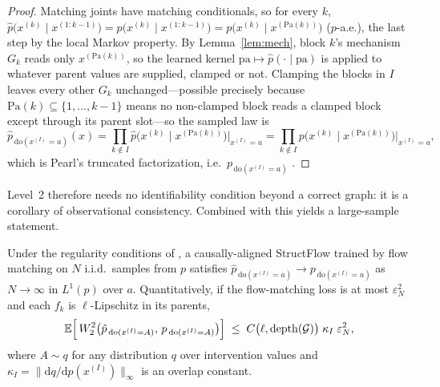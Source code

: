 \begin{proof}
Matching joints have matching conditionals, so for every $k$,
$\hat p\bigl(x^{(k)} \mid x^{(1:k-1)}\bigr) = p\bigl(x^{(k)} \mid x^{(1:k-1)}\bigr)
= p\bigl(x^{(k)} \mid x^{(\mathrm{Pa}(k))}\bigr)$ ($p$-a.e.), the last step by the local
Markov property. By Lemma~\ref{lem:mech}, block $k$'s mechanism $G_k$ reads only
$x^{(\mathrm{Pa}(k))}$, so the learned kernel $\mathrm{pa} \mapsto \hat p(\cdot \mid \mathrm{pa})$ is applied to
whatever parent values are supplied, clamped or not.
Clamping the blocks in $I$ leaves every other $G_k$ unchanged---possible precisely because
$\mathrm{Pa}(k) \subseteq \{1,\dots,k-1\}$ means no non-clamped block reads a clamped block
except through its parent slot---so the sampled law is
\begin{equation}
  \hat p_{\,\mathrm{do}(x^{(I)}=a)}(x) = \prod_{k \notin I}
  \hat p\bigl(x^{(k)} \mid x^{(\mathrm{Pa}(k))}\bigr)\Big|_{x^{(I)}=a}
  = \prod_{k \notin I} p\bigl(x^{(k)} \mid x^{(\mathrm{Pa}(k))}\bigr)\Big|_{x^{(I)}=a},
\end{equation}
which is Pearl's truncated factorization, i.e.\ $p_{\,\mathrm{do}(x^{(I)}=a)}$
\citep[Thm.~3.2.2]{Pearl2009}.
\end{proof}

Level~2 therefore needs no identifiability condition beyond a correct graph: it is a
corollary of observational consistency. Combined with \citet{jeong_conditional_2025} this
yields a large-sample statement.

\begin{corollary}
\label{cor:level2-consistency}
Under the regularity conditions of \citet[Assumptions 1--4]{jeong_conditional_2025}, a
causally-aligned StructFlow trained by flow matching on $N$ i.i.d.\ samples from $p$
satisfies $\hat p_{\,\mathrm{do}(x^{(I)}=a)} \to p_{\,\mathrm{do}(x^{(I)}=a)}$ as $N \to \infty$ in $L^1(p)$ over $a$. Quantitatively, if the flow-matching loss is at most
$\varepsilon_N^2$ and each $f_k$ is $\ell$-Lipschitz in its parents,
\begin{equation}
\label{eq:overlap-bound}
  \mathbb{E}\Bigl[\,W_2^2\bigl(\hat p_{\,\mathrm{do}(x^{(I)}=A)},\,
  p_{\,\mathrm{do}(x^{(I)}=A)}\bigr)\Bigr]
  \;\le\; C\bigl(\ell, \mathrm{depth}(\mathcal{G})\bigr)\; \kappa_I \; \varepsilon_N^2 ,
\end{equation}
where $A \sim q$ for any distribution $q$ over intervention values and
$\kappa_I = \bigl\| \mathrm{d}q / \mathrm{d}p(x^{(I)}) \bigr\|_\infty$ is an overlap constant.
\end{corollary}

